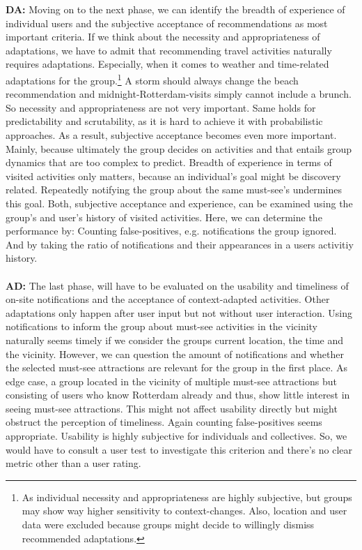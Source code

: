 \documentclass[11pt,a4paper,oneside]{article}
\begin{document}
\textbf{DA:} Moving on to the next phase, we can identify the breadth of experience of individual users and the subjective acceptance of recommendations as most important criteria. If we think about the necessity and appropriateness of adaptations, we have to admit that recommending travel activities naturally requires adaptations. Especially, when it comes to weather and time-related adaptations for the group.\footnote{As individual necessity and appropriateness are highly subjective, but groups may show way higher sensitivity to context-changes. Also, location and user data were excluded because groups might decide to willingly dismiss recommended adaptations.} A storm should always change the beach recommendation and midnight-Rotterdam-visits simply cannot include a brunch. So necessity and appropriateness are not very important. Same holds for predictability and scrutability, as it is hard to achieve it with probabilistic approaches. As a result, subjective acceptance becomes even more important. Mainly, because ultimately the group decides on activities and that entails group dynamics that are too complex to predict. Breadth of experience in terms of visited activities only matters, because an individual's goal might be discovery related. Repeatedly notifying the group about the same must-see's undermines this goal. Both, subjective acceptance and experience, can be examined using the group's and user's history of visited activities. Here, we can determine the performance by: Counting false-positives, e.g. notifications the group ignored. And by taking the ratio of notifications and their appearances in a users activitiy history.\\
\\
\textbf{AD:} The last phase, will have to be evaluated on the usability and timeliness of on-site notifications and the acceptance of context-adapted activities. Other adaptations only happen after user input but not without user interaction. Using notifications to inform the group about must-see activities in the vicinity naturally seems timely if we consider the groups current location, the time and the vicinity. However, we can question the amount of notifications and whether the selected must-see attractions are relevant for the group in the first place. As edge case, a group located in the vicinity of multiple must-see attractions but consisting of users who know Rotterdam already and thus, show little interest in seeing must-see attractions. This might not affect usability directly but might obstruct the perception of timeliness. Again counting false-positives seems appropriate. Usability is highly subjective for individuals and collectives. So, we would have to consult a user test to investigate this criterion and there's no clear metric other than a user rating. 
\end{document}
